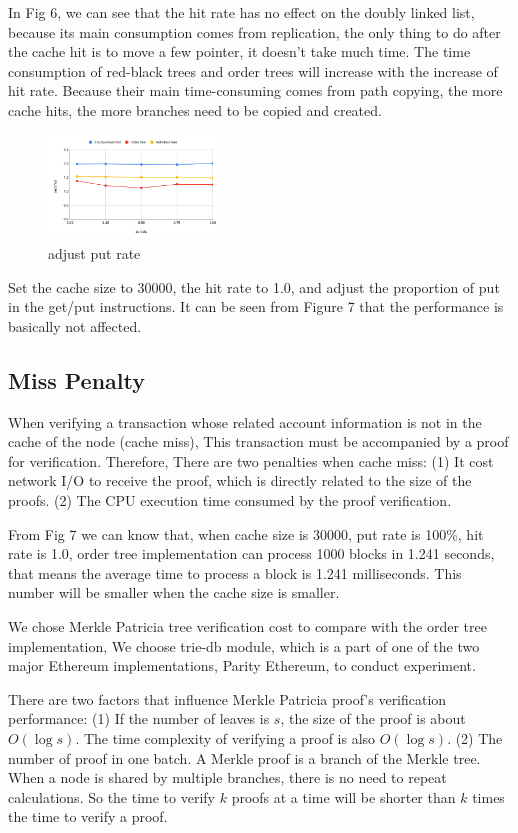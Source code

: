 \documentclass[conference]{IEEEtran}
\begin{document}
In Fig 6, we can see that the hit rate has no effect
on the doubly linked list, because its main consumption
comes from replication, the only thing to do
after the cache hit is to move a few pointer,
it doesn't take much time.
The time consumption of red-black trees and order
trees will increase with the increase of hit rate.
Because their main time-consuming comes from path copying,
the more cache hits, the more branches need
to be copied and created.

\begin{figure}
  \centering
  \includegraphics[width=0.4\textwidth]{adjust_put_rate.png}
  \caption{adjust put rate}
\end{figure}

Set the cache size to 30000, the hit rate to 1.0,
and adjust the proportion of put in the get/put instructions.
It can be seen from Figure 7 that the performance
is basically not affected.

\subsection{Miss Penalty}

When verifying a transaction whose related account information
is not in the cache of the node (cache miss),
This transaction must be accompanied by a proof
for verification. Therefore, There are two penalties when cache miss:
(1) It cost network I/O to receive the proof, which is directly related
to the size of the proofs.
(2) The CPU execution time consumed by the proof verification.

From Fig 7 we can know that, when cache size is 30000,
put rate is 100\%, hit rate is 1.0, order tree implementation
can process 1000 blocks in 1.241 seconds, that means 
the average time to process a block is 1.241 milliseconds.
This number will be smaller when the cache size is smaller.

We chose Merkle Patricia tree verification cost to compare
with the order tree implementation,
We choose trie-db module,
which is a part of one of the two major
Ethereum implementations,
Parity Ethereum, to conduct experiment.

There are two factors that influence
Merkle Patricia proof's verification performance:
(1) If the number of leaves is $s$,
the size of the proof is about $O(\log s)$.
The time complexity of verifying a proof is also $O(\log s)$.
(2) The number of proof in one batch.
A Merkle proof is a branch of the Merkle tree.
When a node is shared by multiple branches,
there is no need to repeat calculations.
So the time to verify $k$ proofs at a time will be
shorter than $k$ times the time to verify a proof.
\end{document}
